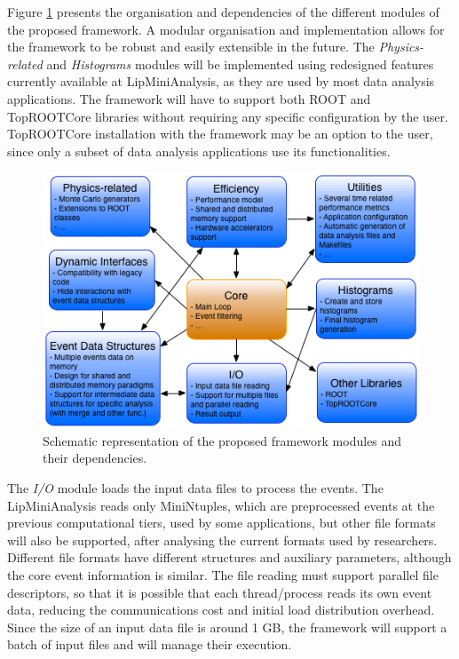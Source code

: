 Figure \ref{fig:new_framework} presents the organisation and dependencies of the different modules of the proposed framework. A modular organisation and implementation allows for the framework to be robust and easily extensible in the future. The \textit{Physics-related} and \textit{Histograms} modules will be implemented using redesigned features currently available at LipMiniAnalysis, as they are used by most data analysis applications. The framework will have to support both ROOT and TopROOTCore libraries without requiring any specific configuration by the user. TopROOTCore installation with the framework may be an option to the user, since only a subset of data analysis applications use its functionalities.

\begin{figure}[!htp]
	\begin{center}
		\includegraphics[scale=0.9]{imgs/new_framework.png}
		\caption{Schematic representation of the proposed framework modules and their dependencies.}
		\label{fig:new_framework}
	\end{center}
\end{figure}

The \textit{I/O} module loads the input data files to process the events. The LipMiniAnalysis reads only MiniNtuples, which are preprocessed events at the previous computational tiers, used by some applications, but other file formats will also be supported, after analysing the current formats used by researchers. Different file formats have different structures and auxiliary parameters, although the core event information is similar. The file reading must support parallel file descriptors, so that it is possible that each thread/process reads its own event data, reducing the communications cost and initial load distribution overhead. Since the size of an input data file is around 1 GB, the framework will support a batch of input files and will manage their execution.

